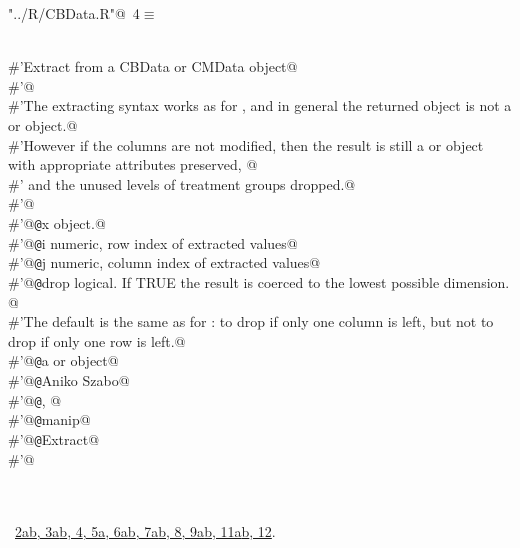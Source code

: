 \documentclass[reqno]{amsart}
\renewcommand{\NWtarget}[2]{\hypertarget{#1}{#2}}
\renewcommand{\NWlink}[2]{\hyperlink{#1}{#2}}
\begin{document}
\begin{flushleft} \small
\begin{minipage}{\linewidth}\label{scrap6}\raggedright\small
\NWtarget{nuweb4}{} \verb@"../R/CBData.R"@\nobreak\ {\footnotesize {4}}$\equiv$
\vspace{-1ex}
\begin{list}{}{} \item
\mbox{}\verb@@\\
\mbox{}\verb@#'Extract from a CBData or CMData object@\\
\mbox{}\verb@#'@\\
\mbox{}\verb@#'The extracting syntax works as for \code{\link{[.data.frame}}, and in general the returned object is not a  or  object.@\\
\mbox{}\verb@#'However if the columns are not modified, then the result is still a  or  object  with appropriate attributes  preserved, @\\
\mbox{}\verb@#' and the unused levels of treatment groups dropped.@\\
\mbox{}\verb@#'@\\
\mbox{}\verb@#'@{\tt @}\verb@param x  object.@\\
\mbox{}\verb@#'@{\tt @}\verb@param i numeric, row index of extracted values@\\
\mbox{}\verb@#'@{\tt @}\verb@param j numeric, column index of extracted values@\\
\mbox{}\verb@#'@{\tt @}\verb@param drop logical. If TRUE the result is coerced to the lowest possible dimension. @\\
\mbox{}\verb@#'The default is the same as for \code{\link{[.data.frame}}: to drop if only one column is left, but not to drop if only one row is left.@\\
\mbox{}\verb@#'@{\tt @}\verb@return a  or  object@\\
\mbox{}\verb@#'@{\tt @}\verb@author Aniko Szabo@\\
\mbox{}\verb@#'@{\tt @}\verb@seealso {}, @\\
\mbox{}\verb@#'@{\tt @}\verb@keywords manip@\\
\mbox{}\verb@#'@{\tt @}\verb@name Extract@\\
\mbox{}\verb@#'@\\
\mbox{}\verb@NULL@\\
\mbox{}\verb@@\\
\mbox{}\verb@@{\NWsep}
\end{list}
\vspace{-1.5ex}
\footnotesize
\begin{list}{}{\setlength{\itemsep}{-\parsep}\setlength{\itemindent}{-\leftmargin}}
\item \NWtxtFileDefBy\ \NWlink{nuweb2a}{2a}\NWlink{nuweb2b}{b}\NWlink{nuweb3a}{, 3a}\NWlink{nuweb3b}{b}\NWlink{nuweb4}{, 4}\NWlink{nuweb5a}{, 5a}\NWlink{nuweb6a}{, 6a}\NWlink{nuweb6b}{b}\NWlink{nuweb7a}{, 7a}\NWlink{nuweb7b}{b}\NWlink{nuweb8}{, 8}\NWlink{nuweb9a}{, 9a}\NWlink{nuweb9b}{b}\NWlink{nuweb11a}{, 11a}\NWlink{nuweb11b}{b}\NWlink{nuweb12}{, 12}.


\end{list}
\end{minipage}
\end{flushleft}
\end{document}
